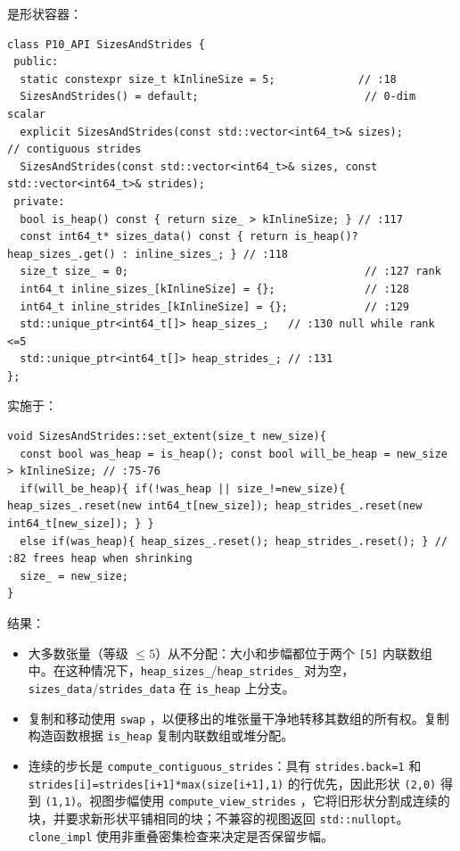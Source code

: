 是形状容器：

\begin{lstlisting}[caption={inline up to 5 dims.}, label=lst:sizesstrides]
class P10_API SizesAndStrides {
 public:
  static constexpr size_t kInlineSize = 5;             // :18
  SizesAndStrides() = default;                          // 0-dim scalar
  explicit SizesAndStrides(const std::vector<int64_t>& sizes);           // contiguous strides
  SizesAndStrides(const std::vector<int64_t>& sizes, const std::vector<int64_t>& strides);
 private:
  bool is_heap() const { return size_ > kInlineSize; } // :117
  const int64_t* sizes_data() const { return is_heap()? heap_sizes_.get() : inline_sizes_; } // :118
  size_t size_ = 0;                                     // :127 rank
  int64_t inline_sizes_[kInlineSize] = {};              // :128
  int64_t inline_strides_[kInlineSize] = {};            // :129
  std::unique_ptr<int64_t[]> heap_sizes_;   // :130 null while rank <=5
  std::unique_ptr<int64_t[]> heap_strides_; // :131
};
\end{lstlisting}

实施于：

\begin{lstlisting}[caption={extent transition.}, label=lst:setextent]
void SizesAndStrides::set_extent(size_t new_size){
  const bool was_heap = is_heap(); const bool will_be_heap = new_size > kInlineSize; // :75-76
  if(will_be_heap){ if(!was_heap || size_!=new_size){ heap_sizes_.reset(new int64_t[new_size]); heap_strides_.reset(new int64_t[new_size]); } }
  else if(was_heap){ heap_sizes_.reset(); heap_strides_.reset(); } // :82 frees heap when shrinking
  size_ = new_size;
}
\end{lstlisting}

结果：

\begin{itemize}[leftmargin=1.2em]
\item 大多数张量（等级 $\le 5$）从不分配：大小和步幅都位于两个 \texttt{[5]} 内联数组中。在这种情况下，\texttt{heap\_sizes\_}/\texttt{heap\_strides\_} 对为空，\texttt{sizes\_data}/\texttt{strides\_data} 在 \texttt{is\_heap} 上分支。
\item 复制和移动使用 \texttt{swap} ，以便移出的堆张量干净地转移其数组的所有权。复制构造函数根据 \texttt{is\_heap} 复制内联数组或堆分配。
\item 连续的步长是 \texttt{compute\_contiguous\_strides}：具有 \texttt{strides.back=1} 和 \texttt{strides[i]=strides[i+1]*max(size[i+1],1)} 的行优先，因此形状 \texttt{(2,0)} 得到 \texttt{(1,1)}。视图步幅使用 \texttt{compute\_view\_strides} ，它将旧形状分割成连续的块，并要求新形状平铺相同的块；不兼容的视图返回 \texttt{std::nullopt}。 \texttt{clone\_impl} 使用非重叠密集检查来决定是否保留步幅。
\end{itemize}

